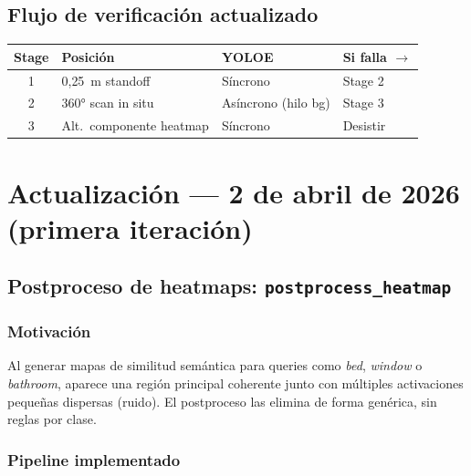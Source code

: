 \documentclass[11pt,a4paper]{article}
\begin{document}
\subsection{Flujo de verificación actualizado}

\begin{center}
\begin{tabular}{clll}
\toprule
Stage & Posición & YOLOE & Si falla $\to$ \\
\midrule
1 & 0{,}25~m standoff & Síncrono & Stage 2 \\
2 & 360° scan in situ & Asíncrono (hilo bg) & Stage 3 \\
3 & Alt.\ componente heatmap & Síncrono & Desistir \\
\bottomrule
\end{tabular}
\end{center}

\section{Actualización — 2 de abril de 2026 (primera iteración)}

\subsection{Postproceso de heatmaps: \texttt{postprocess\_heatmap}}

\subsubsection*{Motivación}
Al generar mapas de similitud semántica para queries como \textit{bed},
\textit{window} o \textit{bathroom}, aparece una región principal coherente
junto con múltiples activaciones pequeñas dispersas (ruido). El postproceso
las elimina de forma genérica, sin reglas por clase.

\subsubsection*{Pipeline implementado}
\end{document}

